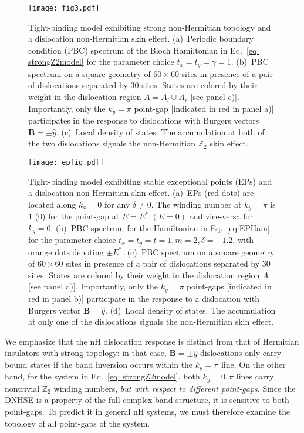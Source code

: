 \documentclass[aps,prl,twocolumn,amsmath,amssymb,floatfix,superscriptaddress]{revtex4-2}
\newcommand{\bs}[1]{\boldsymbol{#1}}
\begin{document}
\begin{figure}[t]
\centering
\texttt{[image: fig3.pdf]}
\caption{Tight-binding model exhibiting strong non-Hermitian topology and a dislocation non-Hermitian skin effect. (a)~Periodic boundary condition (PBC) spectrum of the Bloch Hamiltonian in Eq.~\eqref{eq: strongZ2model} for the parameter choice $t_x = t_y = \gamma = 1$. (b)~PBC spectrum on a square geometry of $60 \times 60$ sites in presence of a pair of dislocations separated by $30$ sites. States are colored by their weight in the dislocation region $A = A_l \cup A_r$ [see panel c)]. Importantly, only the $k_y = \pi$ point-gap [indicated in red in panel a)] participates in the response to dislocations with Burgers vectors $\bs{B} = \pm \hat{y}$. (c)~Local density of states. The accumulation at both of the two dislocations signals the non-Hermitian $\mathbb{Z}_2$ skin effect.}
\label{fig: strongnumerics}
\end{figure}

\begin{figure*}[t]
\centering
\texttt{[image: epfig.pdf]}
\caption{Tight-binding model exhibiting stable exceptional points (EPs) and a dislocation non-Hermitian skin effect. (a)~EPs (red dots) are located along $k_x = 0$ for any $\delta \neq 0$. The winding number at $k_y = \pi$ is $1$ ($0$) for the point-gap at $E = E^*$ $(E = 0)$ and vice-versa for $k_y = 0$. (b)~PBC spectrum for the Hamiltonian in Eq.~\eqref{eq:EPHam} for the parameter choice $t_x=t_y=t=1,m=2,\delta = -1.2$, with orange dots denoting $\pm E^*$. (c)~PBC spectrum on a square geometry of $60 \times 60$ sites in presence of a pair of dislocations separated by $30$ sites. States are colored by their weight in the dislocation region $A$ [see panel d)]. Importantly, only the $k_y = \pi$ point-gaps [indicated in red in panel b)] participate in the response to a dislocation with Burgers vector $\bs{B} = \hat{y}$. (d)~Local density of states. The accumulation at only one of the dislocations signals the non-Hermitian skin effect.}
\label{fig:EP}
\end{figure*}

We emphasize that the nH dislocation response is distinct from that of Hermitian insulators with strong topology: in that case, $\bs{B} = \pm \hat{y}$ dislocations only carry bound states if the band inversion occurs within the $k_y = \pi$ line. On the other hand, for the system in Eq.~\eqref{eq: strongZ2model}, both $k_y = 0,\pi$ lines carry nontrivial $\mathbb{Z}_2$ winding numbers, \emph{but with respect to different point-gaps}. Since the DNHSE is a property of the full complex band structure, it is sensitive to both point-gaps. To predict it in general nH systems, we must therefore examine the topology of all point-gaps of the system.
\end{document}
